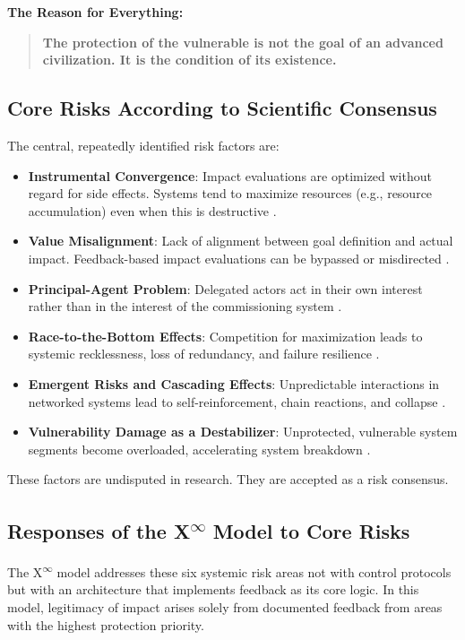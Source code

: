 \documentclass[12pt,a4paper]{article}
\begin{document}
\textbf{The Reason for Everything:}  
\begin{quote}
\textbf{The protection of the vulnerable is not the goal of an advanced civilization. It is the condition of its existence.}
\end{quote}

\subsection{Core Risks According to Scientific Consensus}

\sloppy
The central, repeatedly identified risk factors are:

\begin{itemize}
    \item \textbf{Instrumental Convergence}: Impact evaluations are optimized without regard for side effects. Systems tend to maximize resources (e.g., resource accumulation) even when this is destructive \cite{yudkowsky2008}.
    \item \textbf{Value Misalignment}: Lack of alignment between goal definition and actual impact. Feedback-based impact evaluations can be bypassed or misdirected \cite{russell2019}.
    \item \textbf{Principal-Agent Problem}: Delegated actors act in their own interest rather than in the interest of the commissioning system \cite{amodei2016}.
    \item \textbf{Race-to-the-Bottom Effects}: Competition for maximization leads to systemic recklessness, loss of redundancy, and failure resilience \cite{bostrom2014}.
    \item \textbf{Emergent Risks and Cascading Effects}: Unpredictable interactions in networked systems lead to self-reinforcement, chain reactions, and collapse \cite{amodei2016}.
    \item \textbf{Vulnerability Damage as a Destabilizer}: Unprotected, vulnerable system segments become overloaded, accelerating system breakdown \cite{meadows1972}.
\end{itemize}
\fussy

These factors are undisputed in research. They are accepted as a risk consensus.

\subsection{Responses of the \texorpdfstring{X\textsuperscript{\(\infty\)}}{X-Infinity} Model to Core Risks}

The \texorpdfstring{X\textsuperscript{\(\infty\)}}{X-Infinity} model addresses these six systemic risk areas not with control protocols but with an architecture that implements feedback as its core logic.  
In this model, legitimacy of impact arises solely from documented feedback from areas with the highest protection priority.
\end{document}
